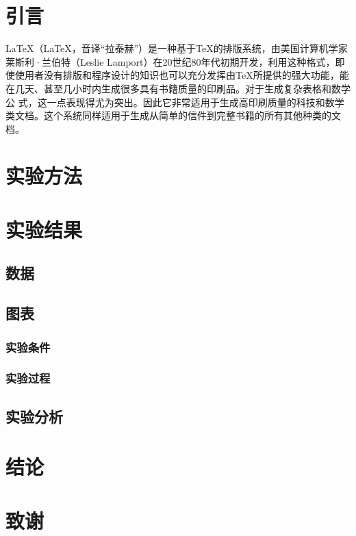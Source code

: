 \documentclass{article}
\begin{document}
		\section{\mbox{引言}}
		LaTeX（\LaTeX，音译“拉泰赫”）是一种基于\TeX 的排版系统，由美国计算机学家莱斯利·兰伯特（Leslie Lamport）在20世纪80年代初期开发，利用这种格式，即	使使用者没有排版和程序设计的知识也可以充分发挥由TeX所提供的强大功能，能在几天、甚至几小时内生成很多具有书籍质量的印刷品。对于生成复杂表格和数学公	式，这一点表现得尤为突出。因此它非常适用于生成高印刷质量的科技和数学类文档。这个系统同样适用于生成从简单的信件到完整书籍的所有其他种类的文档。
		\section{\mbox{实验方法}}
		\section{\mbox{实验结果}}
		\subsection{\mbox{数据}}
		\subsection{\mbox{图表}}
		\subsubsection{\mbox{实验条件}}
		\subsubsection{\mbox{实验过程}}
		\subsection{\mbox{实验分析}}
		\section{\mbox{结论}}
		\section{\mbox{致谢}}
\end{document}
